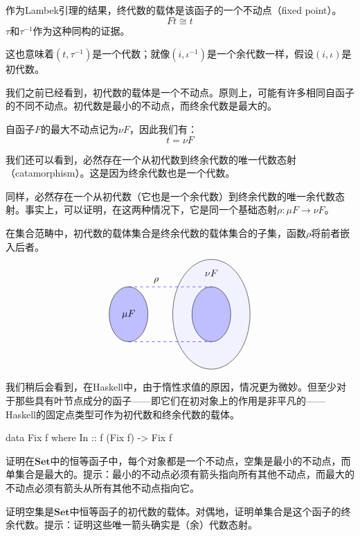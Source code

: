 \documentclass[DaoFP]{subfiles}
\begin{document}
    作为Lambek引理的结果，终代数的载体是该函子的一个不动点（fixed point）。
    \[ F t \cong t \]
    $\tau$和$\tau^{-1}$作为这种同构的证据。

    这也意味着$(t, \tau^{-1})$是一个代数；就像$(i, \iota^{-1})$是一个余代数一样，假设$(i, \iota)$是初代数。

    我们之前已经看到，初代数的载体是一个不动点。原则上，可能有许多相同自函子的不同不动点。初代数是最小的不动点，而终余代数是最大的。

    自函子$F$的最大不动点记为$\nu F$，因此我们有：
    \[ t = \nu F \]

    我们还可以看到，必然存在一个从初代数到终余代数的唯一代数态射（catamorphism）。这是因为终余代数也是一个代数。

    同样，必然存在一个从初代数（它也是一个余代数）到终余代数的唯一余代数态射。事实上，可以证明，在这两种情况下，它是同一个基础态射$\rho \colon \mu F \to \nu F$。

    在集合范畴中，初代数的载体集合是终余代数的载体集合的子集，函数$\rho$将前者嵌入后者。
    \[
        \begin{tikzpicture}
            \draw (-1,0)[fill=blue!25!white] ellipse (0.7 and 1);
            \draw (2,0)[fill=blue!5!white] ellipse (1.4 and 2);
            \draw (2,0)[fill=blue!25!white] ellipse (0.7 and 1);
            \node[above] at (0, 1) {$\rho$};
            \draw[dashed, blue] (-1, 1) -- (2, 1);
            \draw[dashed, blue] (-1, -1) -- (2, -1);
            \node at (-1, 0) { $\mu F$ };
            \node at (2, 1.5) { $\nu F$ };
        \end{tikzpicture}
    \]

    我们稍后会看到，在Haskell中，由于惰性求值的原因，情况更为微妙。但至少对于那些具有叶节点成分的函子——即它们在初对象上的作用是非平凡的——Haskell的固定点类型可作为初代数和终余代数的载体。
    \begin{haskell}
        data Fix f where
        In :: f (Fix f) -> Fix f
    \end{haskell}

    \begin{exercise}
        证明在$\mathbf{Set}$中的恒等函子中，每个对象都是一个不动点，空集是最小的不动点，而单集合是最大的。提示：最小的不动点必须有箭头指向所有其他不动点，而最大的不动点必须有箭头从所有其他不动点指向它。
    \end{exercise}

    \begin{exercise}
        证明空集是$\mathbf{Set}$中恒等函子的初代数的载体。对偶地，证明单集合是这个函子的终余代数。提示：证明这些唯一箭头确实是（余）代数态射。
    \end{exercise}
\end{document}
